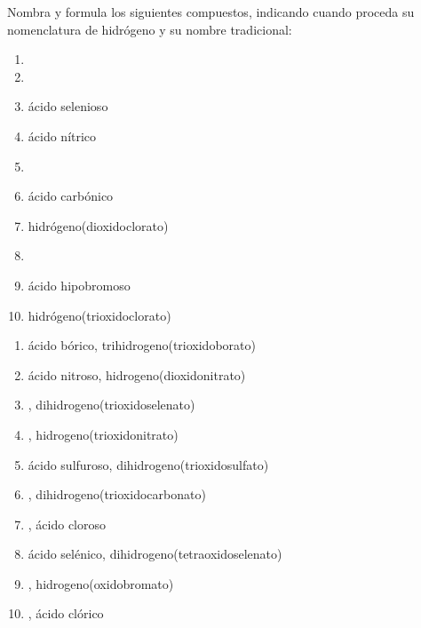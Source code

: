 \documentclass[10pt,a5paper,twoside]{article}
\begin{document}
\begin{exercise}[
    tags    = {inorgánica,ácidos,ácidos binarios,ácidos ternarios,oxoácidos},
    topics  = {química inorgánica,formulación,nomenclatura},
    source  = {SAN Formulación, p28, e36},
  ]
  Nombra y formula los siguientes compuestos, indicando cuando proceda su nomenclatura de hidrógeno y su nombre tradicional:

  \begin{enumerate}
    \item {}
    \item {}
    \item ácido selenioso
    \item ácido nítrico
    \item {}
    \item ácido carbónico
    \item hidrógeno(dioxidoclorato)
    \item {}
    \item ácido hipobromoso
    \item hidrógeno(trioxidoclorato)
  \end{enumerate}
\end{exercise}

\begin{solution}
  \begin{enumerate}
    \item ácido bórico, trihidrogeno(trioxidoborato)
    \item ácido nitroso, hidrogeno(dioxidonitrato)
    \item {}, dihidrogeno(trioxidoselenato)
    \item {}, hidrogeno(trioxidonitrato)
    \item ácido sulfuroso, dihidrogeno(trioxidosulfato)
    \item {}, dihidrogeno(trioxidocarbonato)
    \item {}, ácido cloroso
    \item ácido selénico, dihidrogeno(tetraoxidoselenato)
    \item {}, hidrogeno(oxidobromato)
    \item {}, ácido clórico
  \end{enumerate}
\end{solution}



\newpage
\end{document}
